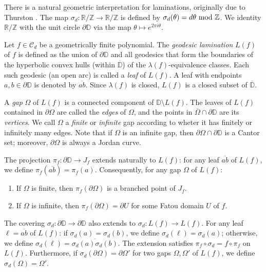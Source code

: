 \documentclass[a4paper,reqno,times, 11pt]{amsart}
\theoremstyle{remark}
\theoremstyle{plain}
\numberwithin{equation}{section}
\def\CCCC{\mathscr C}
\def\R{\mbox{$\mathbb R$}}
\def\D{\mathbb D}
\def\Z{\mbox{$\mathbb Z$}}
\begin{document}
	There is a natural geometric interpretation for laminations, originally  due to Thurston \cite{Th}.
	The map $\sigma_d:\R/\Z\to \R/\Z$ is defined by $\sigma_d(\theta)=d\theta~{\rm mod}~\Z$. We identity $\R/\Z$ with the unit circle $\partial\D$ via the map $\theta\mapsto e^{2\pi i\theta}$.
	
	Let $f\in\CCCC_d$ be a geometrically finite polynomial. The \emph{geodesic lamination}  $L(f)$ of $f$ is defined as the union of $\partial\D$ and all geodesics that form the boundaries of the hyperbolic convex hulls (within $\overline{\mathbb{D}}$) of the  $\lambda(f)$-equivalence classes. Each such geodesic (an open arc) is called a \emph{leaf} of $L(f)$. A leaf with endpoints $a, b\in\partial\mathbb{D}$ is denoted by $\overline{ab}$. Since $\lambda(f)$ is closed, $L(f)$ is a closed subset of $\overline{\D}$.   \vspace{1pt}
	
	A \emph{gap} $\Omega$ of $L(f)$ is a connected component of $\D\setminus L(f)$. The  leaves of $L(f)$ contained in $\partial \Omega$ are called the \emph{edges} of $\Omega$, and the points in $\overline{\Omega}\cap\partial\D$ are its \emph{vertices}. We call $\Omega$ a \emph{finite} or \emph{infinite} gap according to wheter it has finitely or infinitely many edges. Note that if $\Omega$ is an infinite gap, then $\partial\Omega\cap\partial\D$ is a Cantor set; moreover, $\partial\Omega$ is always a Jordan curve.
	
	The projection $\pi_f:\partial \D\to J_f$ extends naturally to $L(f)$: for any leaf $\overline{ab}$ of $L(f)$, we define $\pi_f(\overline{ab})=\pi_f(a)$. Consequently, for any gap $\Omega$ of $L(f)$:
	\begin{enumerate}
		\item[$\bullet$] If $\Omega$ is finite, then $\pi_f(\partial\Omega)$ is a branched point of $J_f$.
		\item[$\bullet$] If $\Omega$ is infinite, then $\pi_f(\partial\Omega)=\partial U$ for some Fatou domain $U$ of $f$.
	\end{enumerate}
	
	The covering $\sigma_d:\partial \D\to \partial\D$ also extends to $\sigma_d:L(f)\to L(f)$. For any leaf $\ell=\overline{ab}$ of $L(f)$: if $\sigma_d(a)=\sigma_d(b)$, we define $\sigma_d(\ell)=\sigma_d(a)$; otherwise, we define $\sigma_d(\ell)=\overline{\sigma_d(a)\sigma_d(b)}$. The extension satisfies $\pi_f\circ \sigma_d=f\circ\pi_f$ on $L(f)$. Furthermore,  if $\sigma_d(\partial\Omega)=\partial \Omega'$ for two gaps $\Omega,\Omega'$ of $L(f)$, we define $\sigma_d(\Omega)=\Omega'$.
	
\end{document}
